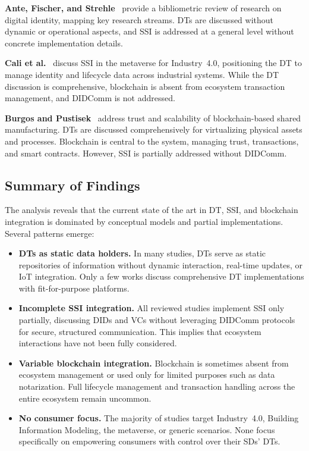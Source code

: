 \textbf{Ante, Fischer, and Strehle}~\cite{ante:fischer:strehle:2022} provide a bibliometric review of research on digital identity, mapping key research streams.
\acp{DT} are discussed without dynamic or operational aspects, and \ac{SSI} is addressed at a general level without concrete implementation details.

\textbf{Cali et al.}~\cite{cali:ferdous:karaarslan:etal:2022} discuss \ac{SSI} in the metaverse for Industry~4.0, positioning the \ac{DT} to manage identity and lifecycle data across industrial systems.
While the \ac{DT} discussion is comprehensive, blockchain is absent from ecosystem transaction management, and \ac{DIDComm} is not addressed.

\textbf{Burgos and Pustisek}~\cite{burgos:pustisek:2023} address trust and scalability of blockchain-based shared manufacturing.
\acp{DT} are discussed comprehensively for virtualizing physical assets and processes.
Blockchain is central to the system, managing trust, transactions, and smart contracts.
However, \ac{SSI} is partially addressed without \ac{DIDComm}.

\subsection{Summary of Findings}
\label{subsec:summary-findings}

The analysis reveals that the current state of the art in \ac{DT}, \ac{SSI}, and blockchain integration is dominated by conceptual models and partial implementations.
Several patterns emerge:

\begin{itemize}
    \item \textbf{\acp{DT} as static data holders.} In many studies, \acp{DT} serve as static repositories of information without dynamic interaction, real-time updates, or \ac{IoT} integration. Only a few works discuss comprehensive \ac{DT} implementations with fit-for-purpose platforms.

    \item \textbf{Incomplete \ac{SSI} integration.} All reviewed studies implement \ac{SSI} only partially, discussing \acp{DID} and \acp{VC} without leveraging \ac{DIDComm} protocols for secure, structured communication. This implies that ecosystem interactions have not been fully considered.

    \item \textbf{Variable blockchain integration.} Blockchain is sometimes absent from ecosystem management or used only for limited purposes such as data notarization. Full lifecycle management and transaction handling across the entire ecosystem remain uncommon.

    \item \textbf{No consumer focus.} The majority of studies target Industry~4.0, Building Information Modeling, the metaverse, or generic scenarios. None focus specifically on empowering consumers with control over their \acp{SD}' \acp{DT}.
\end{itemize}

